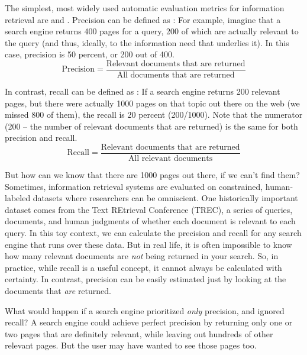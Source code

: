 The simplest, most widely used automatic evaluation metrics for information retrieval are  and .  Precision can be defined as : For example, imagine that a search engine returns 400 pages for a query, 200 of which are actually relevant to the query (and thus, ideally, to the information need that underlies it).  In this case, precision is 50 percent, or 200 out of 400.   
\begin{equation}
\mbox{Precision} = \frac{\mbox{Relevant documents that are returned}}{\mbox{All documents that are returned}} 
\end{equation}

In contrast, recall can be defined as :  If a search engine returns 200 relevant pages, but there were actually 1000 pages on that topic out there on the
web (we missed 800 of them), the recall is 20 percent (200/1000).  Note that the numerator (200 -- the number of relevant documents that are returned) is the same for both precision and recall.  
\begin{equation}
\mbox{Recall} = \frac{\mbox{Relevant documents that are returned}}{\mbox{All relevant documents}} 
\end{equation}

But how can we know that there are 1000 pages out there, if we can't find them?  Sometimes, information retrieval systems are evaluated on constrained, human-labeled datasets where researchers can be omniscient.   One historically important dataset comes from the Text REtrieval Conference (TREC), a series of queries, documents, and human judgments of whether each document is relevant to each query.  In this toy context, we can calculate the precision and recall for any search engine that runs over these data.  But in real life, it is often impossible to know how many relevant documents are \emph{not} being returned in your search.  So, in practice, while recall is a useful concept, it cannot always be calculated with   certainty.  In contrast, precision can be easily estimated just by looking at the documents that \emph{are} returned.



What would happen if a search engine prioritized \emph{only} precision, and ignored recall?  A search engine could achieve perfect precision by returning only one or two pages that are definitely relevant, while leaving out hundreds of other relevant pages.  But the user may have wanted to see those pages too.

